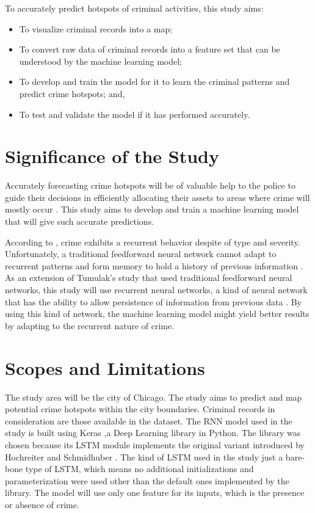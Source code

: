 To accurately predict hotspots of criminal activities, this study aims:
        \begin{itemize}
        \item To visualize criminal records into a map;
        \item To convert raw data of criminal records into a feature set that can be understood by the machine learning model;
        \item To develop and train the model for it to learn the criminal patterns and predict crime hotspots; and,
        \item To test and validate the model if it has performed accurately.
        \end{itemize}

\section{Significance of the Study} %

    Accurately forecasting crime hotspots will be of valuable help to the police to guide their decisions in efficiently allocating their assets to areas where crime will mostly occur \citep{eck2005mapping}. This study aims to develop and train a machine learning model that will give such accurate predictions.

    According to \citet{perc2013understanding}, crime exhibits a recurrent behavior despite of type and severity. Unfortunately, a traditional feedforward neural network cannot adapt to recurrent patterns and form memory to hold a history of previous information \citep{mikolov2010recurrent}. As an extension of Tumulak's study \citeyearpar{tumulak2015crime} that used traditional feedforward neural networks, this study will use recurrent neural networks, a kind of neural network that has the ability to allow persistence of information from previous data \citep{mikolov2010recurrent, guler2005recurrent}. By using this kind of network, the machine learning model might yield better results by adapting to the recurrent nature of crime.

\section{Scopes and Limitations} %

    The study area will be the city of Chicago. The study aims to predict and map potential crime hotspots within the city boundaries. Criminal records in consideration are those available in the dataset. The RNN model used in the study is built using Keras \citeyearpar{chollet2015keras},a Deep Learning library in Python. The library was chosen because its LSTM module implements the original variant introduced by Hochreiter and Schmidhuber \citeyearpar{hochreiter1997long}. The kind of LSTM used in the study just a bare-bone type of LSTM, which means no additional initializations and parameterization were used other than the default ones implemented by the library. The model will use only one feature for its inputs, which is the presence or absence of crime.